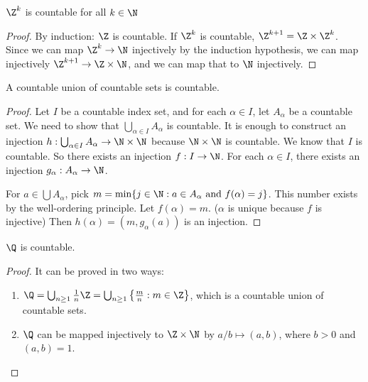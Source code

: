 \documentclass[a4paper]{article}
\begin{document}
\begin{prop}
  $\Z^k$ is countable for all $k\in \N$
\end{prop}

\begin{proof}
  By induction: $\Z$ is countable. If $\Z^k$ is countable, $\Z^{k + 1} = \Z\times \Z^k$. Since we can map $\Z^k \to \N$ injectively by the induction hypothesis, we can map injectively $\Z^{k + 1}\to \Z\times \N$, and we can map that to $\N$ injectively.
\end{proof}

\begin{thm}
  A countable union of countable sets is countable.
\end{thm}

\begin{proof}
  Let $I$ be a countable index set, and for each $\alpha \in I$, let $A_\alpha$ be a countable set. We need to show that $\bigcup_{\alpha\in I} A_\alpha$ is countable. It is enough to construct an injection $h: \bigcup_{\alpha\in I} A_\alpha \to \N\times \N$ because $\N\times\N$ is countable. We know that $I$ is countable. So there exists an injection $f: I\to \N$. For each $\alpha\in I$, there exists an injection $g_\alpha: A_\alpha \to\N$.

  For $a\in \bigcup A_\alpha$, pick $m = \min\{j\in \N: a\in A_{\alpha}\text{ and }f(\alpha) = j\}$. This number exists by the well-ordering principle. Let $f(\alpha) = m$. ($\alpha$ is unique because $f$ is injective) Then $h(\alpha) = (m,g_\alpha(a))$ is an injection.
\end{proof}

\begin{prop}
  $\Q$ is countable.
\end{prop}
\begin{proof}
  It can be proved in two ways:
  \begin{enumerate}
    \item $\Q = \bigcup_{n\geq 1} \frac{1}{n}\Z = \bigcup_{n\geq 1} \left\{\frac{m}{n}: m\in \Z\right\}$, which is a countable union of countable sets.
    \item $\Q$ can be mapped injectively to $\Z\times \N$ by $a/b\mapsto (a, b)$, where $b > 0$ and $(a, b) = 1$.
  \end{enumerate}
\end{proof}
\end{document}
